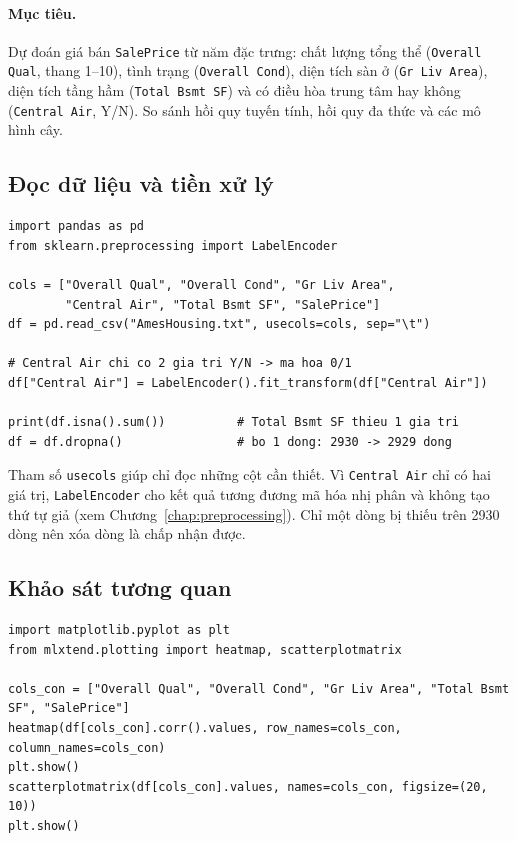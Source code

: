 \paragraph{Mục tiêu.} Dự đoán giá bán \texttt{SalePrice} từ năm đặc trưng: chất lượng tổng thể (\texttt{Overall Qual}, thang 1--10), tình trạng (\texttt{Overall Cond}), diện tích sàn ở (\texttt{Gr Liv Area}), diện tích tầng hầm (\texttt{Total Bsmt SF}) và có điều hòa trung tâm hay không (\texttt{Central Air}, Y/N). So sánh hồi quy tuyến tính, hồi quy đa thức và các mô hình cây.

\subsection{Đọc dữ liệu và tiền xử lý}

\begin{lstlisting}[caption={Lab 1 -- đọc và tiền xử lý dữ liệu}]
import pandas as pd
from sklearn.preprocessing import LabelEncoder

cols = ["Overall Qual", "Overall Cond", "Gr Liv Area",
        "Central Air", "Total Bsmt SF", "SalePrice"]
df = pd.read_csv("AmesHousing.txt", usecols=cols, sep="\t")

# Central Air chi co 2 gia tri Y/N -> ma hoa 0/1
df["Central Air"] = LabelEncoder().fit_transform(df["Central Air"])

print(df.isna().sum())          # Total Bsmt SF thieu 1 gia tri
df = df.dropna()                # bo 1 dong: 2930 -> 2929 dong
\end{lstlisting}

Tham số \texttt{usecols} giúp chỉ đọc những cột cần thiết. Vì \texttt{Central Air} chỉ có hai giá trị, \texttt{LabelEncoder} cho kết quả tương đương mã hóa nhị phân và không tạo thứ tự giả (xem Chương~\ref{chap:preprocessing}). Chỉ một dòng bị thiếu trên 2930 dòng nên xóa dòng là chấp nhận được.

\subsection{Khảo sát tương quan}

\begin{lstlisting}[caption={Lab 1 -- ma trận tương quan và ma trận biểu đồ phân tán}]
import matplotlib.pyplot as plt
from mlxtend.plotting import heatmap, scatterplotmatrix

cols_con = ["Overall Qual", "Overall Cond", "Gr Liv Area", "Total Bsmt SF", "SalePrice"]
heatmap(df[cols_con].corr().values, row_names=cols_con, column_names=cols_con)
plt.show()
scatterplotmatrix(df[cols_con].values, names=cols_con, figsize=(20, 10))
plt.show()
\end{lstlisting}

